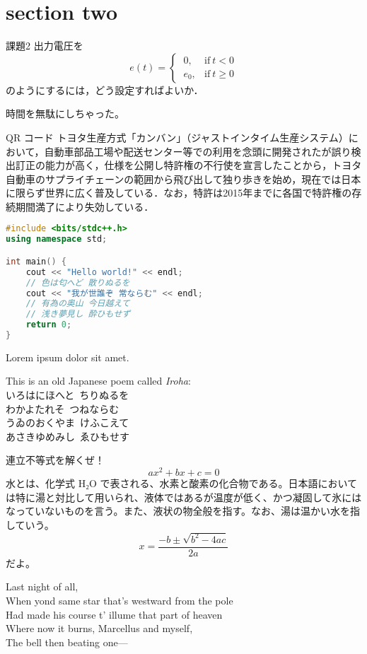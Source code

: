 \section{section two}

\begin{mytbox}{課題2}
	出力電圧を
	\begin{equation*}
		e(t) =
		\begin{cases}
			\ 0,   & \text{if}\ t < 0   \\
			\ e_0, & \text{if}\ t \ge 0
		\end{cases}
	\end{equation*}
	のようにするには，どう設定すればよいか．
\end{mytbox}

{
\kyokasho
時間を無駄にしちゃった。
}

\begin{mybbox}{QR コード}
	トヨタ生産方式「カンバン」（ジャストインタイム生産システム）において，自動車部品工場や配送センター等での利用を念頭に開発されたが誤り検出訂正の能力が高く，仕様を公開し特許権の不行使を宣言したことから，トヨタ自動車のサプライチェーンの範囲から飛び出して独り歩きを始め，現在では日本に限らず世界に広く普及している．なお，特許は2015年までに各国で特許権の存続期間満了により失効している．
\end{mybbox}

\begin{lstlisting}[language=C++]
#include <bits/stdc++.h>
using namespace std;

int main() {
	cout << "Hello world!" << endl;
	// 色は匂へど 散りぬるを
	cout << "我が世誰ぞ 常ならむ" << endl;
	// 有為の奥山 今日越えて
	// 浅き夢見し 酔ひもせず
	return 0;
}
\end{lstlisting}

Lorem ipsum dolor sit amet.

This is an old Japanese poem called \emph{Iroha}: \\
いろはにほへと\ ちりぬるを \\
わかよたれそ\ つねならむ \\
うゐのおくやま\ けふこえて \\
あさきゆめみし\ ゑひもせす

連立不等式を解くぜ！
\begin{equation}
	ax^2 + bx + c = 0
\end{equation}
水とは、化学式 H₂O で表される、水素と酸素の化合物である。日本語においては特に湯と対比して用いられ、液体ではあるが温度が低く、かつ凝固して氷にはなっていないものを言う。また、液状の物全般を指す。なお、湯は温かい水を指していう。
\begin{equation}
	x = \frac{-b \pm \sqrt{b^2 - 4ac}}{2a}
\end{equation}
だよ。

Last night of all, \\
When yond same star that's westward from the pole \\
Had made his course t' illume that part of heaven \\
Where now it burns, Marcellus and myself, \\
The bell then beating one—
